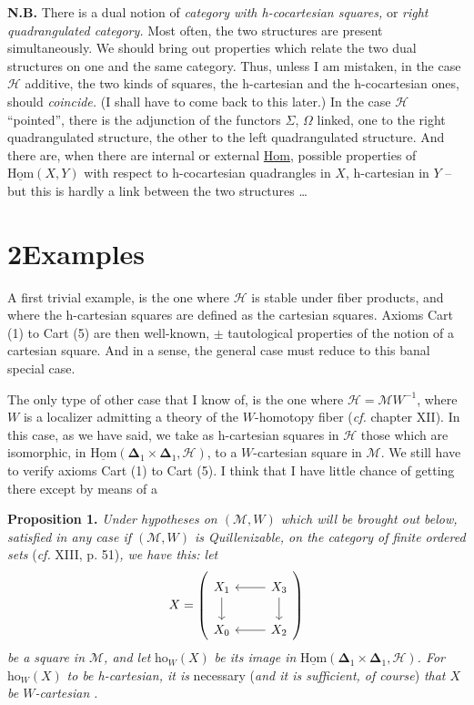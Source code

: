 \documentclass[11pt]{article}
\newcommand{\printedpage}[1]{\marginpar{\footnotesize p.~#1}}
\newcommand{\msp}[1]{\marginpar{\footnotesize [#1]}}
\newcommand{\uHom}{\underline{\mathrm{Hom}}}
\newcommand{\bDelta}{\mathbf{\Delta}}
\newcommand{\ho}{\mathrm{ho}}
\begin{document}
\printedpage{6}

\msp{page 7}
\textbf{N.B.} There is a dual notion of \textit{category with h-cocartesian squares,} or \textit{right quadrangulated category.} Most often, the two structures are present simultaneously. We should bring out properties which relate the two dual structures on one and the same category. Thus, unless I am mistaken, in the case $\mathcal{H}$ additive, the two kinds of squares, the h-cartesian and the h-cocartesian ones, should \textit{coincide.} (I shall have to come back to this later.) In the case $\mathcal{H}$ ``pointed'', there is the adjunction of the functors $\Sigma$, $\Omega$ linked, one to the right quadrangulated structure, the other to the left quadrangulated structure. And there are, when there are internal or external \underline{Hom}, possible properties of $\uHom(X,Y)$ with respect to h-cocartesian quadrangles in $X$, h-cartesian in $Y$ -- but this is hardly a link between the two structures \ldots

\section*{2\quad Examples}

A first trivial example, is the one where $\mathcal{H}$ is stable under fiber products, and where the h-cartesian squares are defined as the cartesian squares. Axioms Cart (1) to Cart (5) are then well-known, $\pm$ tautological properties of the notion of a cartesian square. And
\msp{page 8}
in a sense, the general case must reduce to this banal special case.

The only type of other case that I know of, is the one where $\mathcal{H} = \mathcal{M}W^{-1}$, where $W$ is a localizer admitting a theory of the $W$-homotopy fiber (\textit{cf.} chapter XII). In this case, as we have said, we take as h-cartesian squares in $\mathcal{H}$ those which are isomorphic, in $\uHom(\bDelta_1 \times \bDelta_1, \mathcal{H})$, to a $W$-cartesian square in $\mathcal{M}$. We still have to verify axioms Cart (1) to Cart (5). I think that I have little chance of getting there except by means of a

\textbf{Proposition 1.} \textit{Under hypotheses on $(\mathcal{M}, W)$ which will be brought out below, satisfied in any case if $(\mathcal{M}, W)$ is Quillenizable, on the category of finite ordered sets} (\textit{cf.} XIII, p. 51)\textit{, we have this: let}
\[
X = \left(\begin{tikzcd}
X_1 \ar[d] & X_3 \ar[l] \ar[d] \\
X_0 & X_2 \ar[l]
\end{tikzcd}\right)
\]
\textit{be a square in $\mathcal{M}$, and let} $\ho_W(X)$ \textit{be its image in} $\uHom(\bDelta_1 \times \bDelta_1, \mathcal{H})$\textit{. For} $\ho_W(X)$ \textit{to be h-cartesian, it is} necessary (\textit{and it is sufficient, of course}) \textit{that $X$ be $W$-cartesian} \textit{.}

\printedpage{7}

\end{document}
